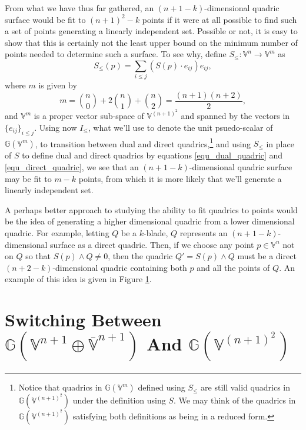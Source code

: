\documentclass{birkjour}
\theoremstyle{definition}
\theoremstyle{remark}
\numberwithin{equation}{section}
\newcommand{\G}{\mathbb{G}}
\newcommand{\V}{\mathbb{V}}
\newcommand{\Vb}{\mathbb{\overline{V}}}
\begin{document}
From what we have thus far gathered, an $(n+1-k)$-dimensional quadric surface
would be fit to $(n+1)^2-k$ points if it were at all possible to find such a set
of points generating a linearly independent set.  Possible or not, it is easy to show that this
is certainly not the least upper bound on the minimum number of points needed to determine
such a surface.  To see why, define $S_{\leq}:\V^n\to\V^m$ as
\begin{equation}
S_{\leq}(p) = \sum_{i\leq j}(S(p)\cdot e_{ij})e_{ij},
\end{equation}
where $m$ is given by
\begin{equation}
m = \binom{n}{0}+2\binom{n}{1}+\binom{n}{2} = \frac{(n+1)(n+2)}{2},
\end{equation}
and $\V^m$ is a proper vector sub-space of $\V^{(n+1)^2}$ and spanned
by the vectors in $\{e_{ij}\}_{i\leq j}$.
Using now $I_{\leq}$, what we'll use to denote the unit psuedo-scalar of $\G(\V^m)$,
to transition between dual and direct quadrics,\footnote{Notice that quadrics in $\G(\V^m)$
defined using $S_{\leq}$ are still valid quadrics in $\G(\V^{(n+1)^2})$ under the definition
using $S$.  We may think of the
quadrics in $\G(\V^{(n+1)^2})$ satisfying both definitions as being in a reduced form.}
and using $S_{\leq}$ in place of $S$
to define dual and direct quadrics by equations \eqref{equ_dual_quadric} and
\eqref{equ_direct_quadric}, we see that
an $(n+1-k)$-dimensional quadric surface may be fit to $m-k$ points, from which it
is more likely that we'll generate a linearly independent set.

A perhaps better approach to studying the ability to fit quadrics to
points would be the idea of generating a higher dimensional quadric
from a lower dimensional quadric.  For example, letting $Q$ be a $k$-blade, $Q$
represents an $(n+1-k)$-dimensional surface as a direct quadric.  Then,
if we choose any point $p\in\V^n$ not on $Q$ so that $S(p)\wedge Q\neq 0$,
then the quadric $Q'=S(p)\wedge Q$ must be a direct $(n+2-k)$-dimensional quadric containing
both $p$ and all the points of $Q$.  An example of this idea is given in Figure \ref{}.



\section{Switching Between $\G(\V^{n+1}\oplus\Vb^{n+1})$ And $\G(\V^{(n+1)^2})$}
\end{document}
